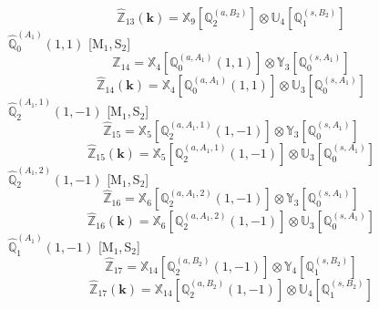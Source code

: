 \documentclass[fleqn,10pt,landscape]{article}
\begin{document}
\begin{itemize}
\begin{dmath*}
\end{dmath*}
\begin{dmath*}
\hat{\mathbb{Z}}_{13}(\bm{k})=\mathbb{X}_{9}[\mathbb{Q}_{2}^{(a,B_{2})}] \otimes\mathbb{U}_{4}[\mathbb{Q}_{1}^{(s,B_{2})}]
\end{dmath*}
\vspace{4mm}
\noindent {} $\,\,\,\hat{\mathbb{Q}}_{0}^{(A_{1})}(1,1)$ [M$_{1}$,\,S$_{2}$]
\begin{dmath*}
\hat{\mathbb{Z}}_{14}=\mathbb{X}_{4}[\mathbb{Q}_{0}^{(a,A_{1})}(1,1)] \otimes\mathbb{Y}_{3}[\mathbb{Q}_{0}^{(s,A_{1})}]
\end{dmath*}
\begin{dmath*}
\hat{\mathbb{Z}}_{14}(\bm{k})=\mathbb{X}_{4}[\mathbb{Q}_{0}^{(a,A_{1})}(1,1)] \otimes\mathbb{U}_{3}[\mathbb{Q}_{0}^{(s,A_{1})}]
\end{dmath*}
\vspace{4mm}
\noindent {} $\,\,\,\hat{\mathbb{Q}}_{2}^{(A_{1},1)}(1,-1)$ [M$_{1}$,\,S$_{2}$]
\begin{dmath*}
\hat{\mathbb{Z}}_{15}=\mathbb{X}_{5}[\mathbb{Q}_{2}^{(a,A_{1},1)}(1,-1)] \otimes\mathbb{Y}_{3}[\mathbb{Q}_{0}^{(s,A_{1})}]
\end{dmath*}
\begin{dmath*}
\hat{\mathbb{Z}}_{15}(\bm{k})=\mathbb{X}_{5}[\mathbb{Q}_{2}^{(a,A_{1},1)}(1,-1)] \otimes\mathbb{U}_{3}[\mathbb{Q}_{0}^{(s,A_{1})}]
\end{dmath*}
\vspace{4mm}
\noindent {} $\,\,\,\hat{\mathbb{Q}}_{2}^{(A_{1},2)}(1,-1)$ [M$_{1}$,\,S$_{2}$]
\begin{dmath*}
\hat{\mathbb{Z}}_{16}=\mathbb{X}_{6}[\mathbb{Q}_{2}^{(a,A_{1},2)}(1,-1)] \otimes\mathbb{Y}_{3}[\mathbb{Q}_{0}^{(s,A_{1})}]
\end{dmath*}
\begin{dmath*}
\hat{\mathbb{Z}}_{16}(\bm{k})=\mathbb{X}_{6}[\mathbb{Q}_{2}^{(a,A_{1},2)}(1,-1)] \otimes\mathbb{U}_{3}[\mathbb{Q}_{0}^{(s,A_{1})}]
\end{dmath*}
\vspace{4mm}
\noindent {} $\,\,\,\hat{\mathbb{Q}}_{1}^{(A_{1})}(1,-1)$ [M$_{1}$,\,S$_{2}$]
\begin{dmath*}
\hat{\mathbb{Z}}_{17}=\mathbb{X}_{14}[\mathbb{Q}_{2}^{(a,B_{2})}(1,-1)] \otimes\mathbb{Y}_{4}[\mathbb{Q}_{1}^{(s,B_{2})}]
\end{dmath*}
\begin{dmath*}
\hat{\mathbb{Z}}_{17}(\bm{k})=\mathbb{X}_{14}[\mathbb{Q}_{2}^{(a,B_{2})}(1,-1)] \otimes\mathbb{U}_{4}[\mathbb{Q}_{1}^{(s,B_{2})}]

\end{dmath*}
\end{itemize}
\end{document}

